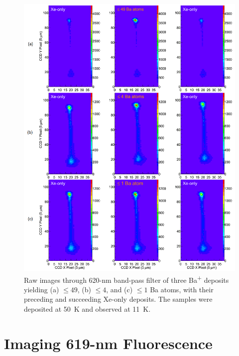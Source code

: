 


\begin{figure} %
        \centering
                \includegraphics[width=.95\textwidth]{figures/xebaxe_instantaneous_scrunched.png}
                \caption{Raw images through 620-nm band-pass filter of three Ba\textsuperscript{+} deposits yielding (a) $\leq 49$, (b) $\leq 4$, and (c) $\leq 1$ Ba atoms, with their preceding and succeeding Xe-only deposits.  The samples were deposited at 50~K and observed at 11~K.}
\label{fig:xebaxe}
\end{figure}

\section{Imaging 619-nm Fluorescence}
\label{sec:imaging619}

